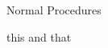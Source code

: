 \documentclass[11pt,twocolumn,letterpaper]{article}
\newcommand*{\protitle}{\Large\textsf}
\begin{document}
\begin{center}

	{\protitle{Normal Procedures}}

	this and that

\end{center}
\end{document}
